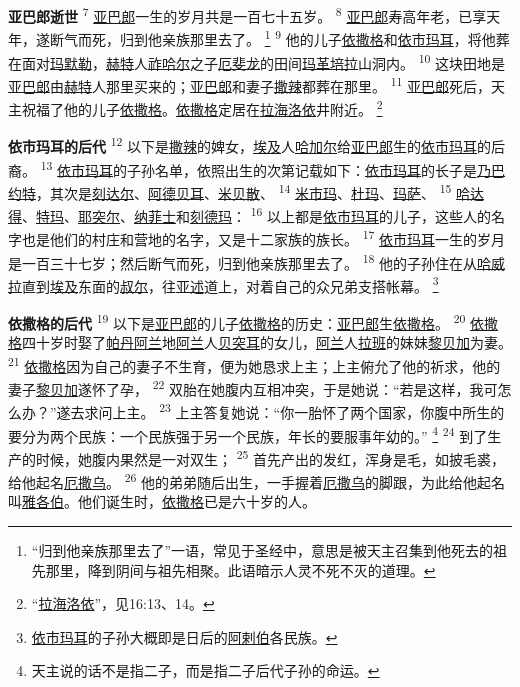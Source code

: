 \textbf{亚巴郎逝世 }
\textsuperscript{7}
\uline{亚巴郎}一生的岁月共是一百七十五岁。
\textsuperscript{8}
\uline{亚巴郎}寿高年老，已享天年，遂断气而死，归到他亲族那里去了。
\footnote{“归到他亲族那里去了”一语，常见于圣经中，意思是被天主召集到他死去的祖先那里，降到阴间与祖先相聚。此语暗示人灵不死不灭的道理。}
\textsuperscript{9}
他的儿子\uline{依撒格}和\uline{依市玛耳}，将他葬在面对\uline{玛默勒}，\uline{赫特}人\uline{祚哈尔}之子\uline{厄斐龙}的田间\uline{玛革}\uline{培拉}山洞内。
\textsuperscript{10}
这块田地是\uline{亚巴郎}由\uline{赫特}人那里买来的；\uline{亚巴郎}和妻子\uline{撒辣}都葬在那里。
\textsuperscript{11}
\uline{亚巴郎}死后，天主祝福了他的儿子\uline{依撒格}。\uline{依撒格}定居在\uline{拉海}\uline{洛依}井附近。
\footnote{“\uline{拉海}\uline{洛依}”，见16:13、14。}

\textbf{依市玛耳的后代 }
\textsuperscript{12}
以下是\uline{撒辣}的婢女，\uline{埃及}人\uline{哈加尔}给\uline{亚巴郎}生的\uline{依市玛耳}的后裔。
\textsuperscript{13}
\uline{依市玛耳}的子孙名单，依照出生的次第记载如下：\uline{依市玛耳}的长子是\uline{乃巴约特}，其次是\uline{刻达尔}、\uline{阿德贝耳}、\uline{米贝散}、
\textsuperscript{14}
\uline{米市玛}、\uline{杜玛}、\uline{玛萨}、
\textsuperscript{15}
\uline{哈达得}、\uline{特玛}、\uline{耶突尔}、\uline{纳菲士}和\uline{刻德玛}：
\textsuperscript{16}
以上都是\uline{依市玛耳}的儿子，这些人的名字也是他们的村庄和营地的名字，又是十二家族的族长。
\textsuperscript{17}
\uline{依市玛耳}一生的岁月是一百三十七岁；然后断气而死，归到他亲族那里去了。
\textsuperscript{18}
他的子孙住在从\uline{哈威拉}直到\uline{埃及}东面的\uline{叔尔}，往\uline{亚述}道上，对着自己的众兄弟支搭帐幕。
\footnote{\uline{依市玛耳}的子孙大概即是日后的\uline{阿剌伯}各民族。}

\textbf{依撒格的后代 }
\textsuperscript{19}
以下是\uline{亚巴郎}的儿子\uline{依撒格}的历史：\uline{亚巴郎}生\uline{依撒格}。
\textsuperscript{20}
\uline{依撒格}四十岁时娶了\uline{帕丹}\uline{阿兰}地\uline{阿兰}人\uline{贝突耳}的女儿，\uline{阿兰}人\uline{拉班}的妹妹\uline{黎贝加}为妻。
\textsuperscript{21}
\uline{依撒格}因为自己的妻子不生育，便为她恳求上主；上主俯允了他的祈求，他的妻子\uline{黎贝加}遂怀了孕，
\textsuperscript{22}
双胎在她腹内互相冲突，于是她说：“若是这样，我可怎么办？”遂去求问上主。
\textsuperscript{23}
上主答复她说：“你一胎怀了两个国家，你腹中所生的要分为两个民族：一个民族强于另一个民族，年长的要服事年幼的。”
\footnote{天主说的话不是指二子，而是指二子后代子孙的命运。}
\textsuperscript{24}
到了生产的时候，她腹内果然是一对双生；
\textsuperscript{25}
首先产出的发红，浑身是毛，如披毛裘，给他起名\uline{厄撒乌}。
\textsuperscript{26}
他的弟弟随后出生，一手握着\uline{厄撒乌}的脚跟，为此给他起名叫\uline{雅各伯}。他们诞生时，\uline{依撒格}已是六十岁的人。

